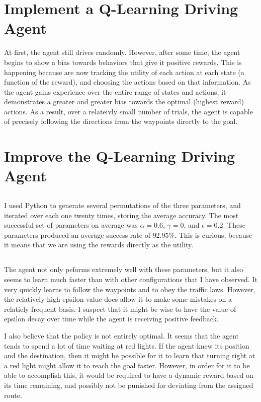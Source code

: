 \documentclass[12pt]{article}
\begin{document}
\section{Implement a Q-Learning Driving Agent}
At first, the agent still drives randomly.
However, after some time, the agent begins to show a bias towards behaviors that give it positive rewards. 
This is happening because are now tracking the utility of each action at each state (a function of the reward), and choosing the actions based on that information.
As the agent gains experience over the entire range of states and actions, it demonstrates a greater and greater bias towards the optimal (highest reward) actions.
As a result, over a relateivly small number of trials, the agent is capable of precisely following the directions from the waypoints directly to the goal.


\section{Improve the Q-Learning Driving Agent}
\subsection{}
I used Python to generate several permutations of the three parameters, and iterated over each one twenty times, storing the average accuracy.
The most successful set of parameters on average was $\alpha = 0.6$, $\gamma = 0$, and $\epsilon = 0.2$.
These parameters produced an average success rate of $92.95\%$.
This is curious, because it means that we are using the rewards directly as the utility.

\subsection{}
The agent not only peforms extremely well with these parameters, but it also seems to learn much faster than with other configurations that I have observed.
It very quickly learns to follow the waypoints and to obey the traffic laws.
However, the relatively high epsilon value does allow it to make some mistakes on a relatiely frequent basis.
I suspect that it might be wise to have the value of epsilon decay over time while the agent is receiving positive feedback.

I also believe that the policy is not entirely optimal.
It seems that the agent tends to spend a lot of time waiting at red lights.
If the agent knew its position and the destination, then it might be possible for it to learn that turning right at a red light might allow it to reach the goal faster.
However, in order for it to be able to accomplish this, it would be required to have a dynamic reward based on its time remaining, and possibly not be punished for deviating from the assigned route.
\end{document}

